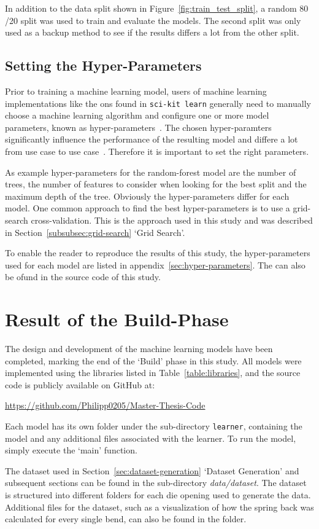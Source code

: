 In addition to the data split shown in Figure~\ref{fig:train_test_split}, a random 80
/20 split was used to train and evaluate the models.
The second split was only used as a backup method to see if the results differs a lot from the other split.

\subsection{Setting the Hyper-Parameters}\label{subsec:hyper-parameters}
Prior to training a machine learning model, users of machine learning implementations like the ons found in
\texttt{sci-kit learn} generally need to manually choose a machine learning algorithm and configure one or more model
parameters, known as hyper-parameters~\cite[pp. 1]{claesen2015hyperparameter}.
The chosen hyper-paramters significantly influence the performance of the resulting model and differe a lot from use
case to use case~\cite[pp. 1]{claesen2015hyperparameter}.
Therefore it is important to set the right parameters.

As example hyper-parameters for the random-forest model are the number of trees, the number of features to consider when
looking for the best split and the maximum depth of the tree.
Obviously the hyper-parameters differ for each model.
One common approach to find the best hyper-parameters is to use a grid-search cross-validation.
This is the approach used in this study and was described in Section~\ref{subsubsec:grid-search} `Grid Search'.

To enable the reader to reproduce the results of this study, the hyper-parameters used for each model are listed in
appendix~\ref{sec:hyper-parameters}.
The can also be ofund in the source code of this study.

\section{Result of the Build-Phase}\label{sec:results-build-phase}

The design and development of the machine learning models have been completed, marking the end of the `Build' phase
in this study.
All models were implemented using the libraries listed in Table~\ref{table:libraries}, and the source
code is publicly available on GitHub at:

\url{https://github.com/Philipp0205/Master-Thesis-Code}

Each model has its own folder under the sub-directory \texttt{learner}, containing the model and any additional files
associated with the learner. To run the model, simply execute the `main' function.

The dataset used in Section~\ref{sec:dataset-generation} `Dataset Generation' and subsequent sections can be found in
the sub-directory \textit{data/dataset}. The dataset is structured into different folders for each die opening used
to generate the data. Additional files for the dataset, such as a visualization of how the spring back was calculated
for every single bend, can also be found in the folder.